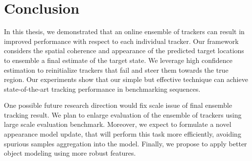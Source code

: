 \chapter{Conclusion}
\label{chapter::conclusions}

In this thesis, we demonstrated that an online ensemble of trackers can result
in improved performance with respect to each individual tracker. Our framework
considers the spatial coherence and appearance of the predicted target locations
to ensemble a final estimate of the target state. We leverage high confidence
estimation to reinitialize trackers that fail and steer them towards the true
region. Our experiments show that our simple but effective technique can achieve
state-of-the-art tracking performance in benchmarking sequences.

One possible future research direction would fix scale issue of final ensemble
tracking result. We plan to enlarge evaluation of the ensemble of trackers
using large scale evaluation benchmark. Moreover, we expect to formulate a novel
appearance model update, that will perform this task more efficiently, avoiding
spurious samples aggregation into the model. Finally, we propose to apply
better object modeling using more robust features.